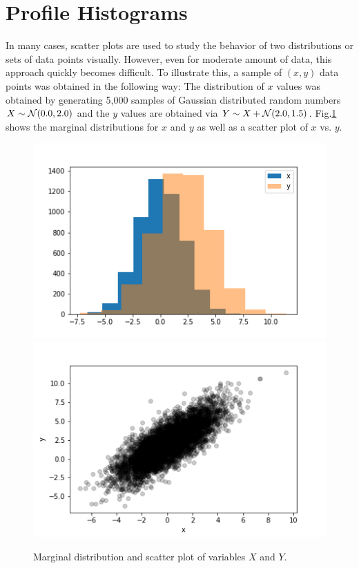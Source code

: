 \documentclass[BCOR=1mm, DIV=calc,10pt,
twoside=true,
twocolumn,
headings=normal]{scrartcl}
\newcommand{\fig}{Fig.}
\begin{document}



\appendix

\section{Profile Histograms}
\label{sec:profile}

In many cases, scatter plots are used to study the behavior of two distributions or sets of data points visually. However, even for moderate amount of data, this approach quickly becomes difficult. To illustrate this, a sample of $(x,y)$ data points was obtained in the following way: The distribution of $x$ values was obtained by generating 5,000 samples of Gaussian distributed random numbers $X \sim {\cal N}(0.0,2.0)$ and the $y$ values are obtained via $Y \sim X +  {\cal N}(2.0,1.5)$. \fig \ref{fig:scatter} shows the marginal distributions for $x$ and $y$ as well as a scatter plot of $x$ vs. $y$.

\begin{figure}
\begin{center}
\includegraphics[scale=0.5]{../figures/marginal} \includegraphics[scale=0.5]{../figures/scatter}
\caption{\label{fig:scatter} Marginal distribution and scatter plot of variables $X$ and $Y$.}
\end{center}
\end{figure}
\end{document}
